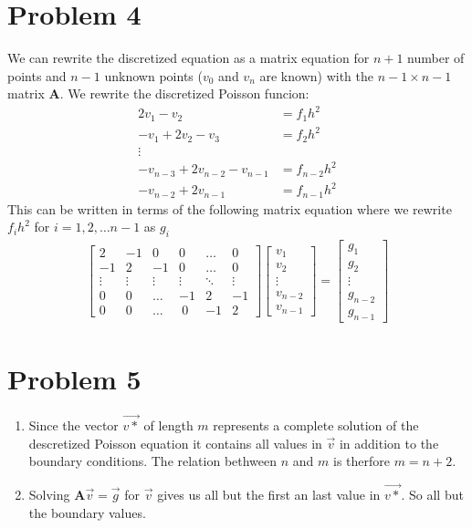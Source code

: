 \documentclass[english,notitlepage]{revtex4-1}  %
\begin{document}
\section*{Problem 4}
We can rewrite the discretized equation as a matrix equation for $n+1$ number of points and $n-1$ unknown points ($v_0$ and $v_n$ are known) with the $n-1\times n-1$ matrix $\boldsymbol{A}$. We rewrite the discretized Poisson funcion:
\begin{align*}
  2 v_1- v_2 &= f_1 h^2\\
  -v_{1} +2 v_2 - v_{3} &= f_2 h^2 \\
    \vdots \\
  -v_{n-3} + 2 v_{n-2} - v_{n-1} &= f_{n-2} h^2\\
  - v_{n-2} + 2 v_{n-1}  &= f_{n-1} h^2
\end{align*}
This can be written in terms of the following matrix equation where we rewrite $f_i h^2$ for $i = 1,2,\dots n-1$ as $g_i$
\begin{align*}
  \begin{bmatrix}
    2 & -1 & 0 & 0 & \dots &0 \\
    -1 & 2 & -1 & 0 &\dots& 0 \\
    \vdots & \vdots & \vdots & \vdots & \ddots & \vdots\\
    0 & 0 & \dots & -1 & 2 & -1 \\
    0 & 0 & \dots & \ 0 &-1 & 2
  \end{bmatrix}
  \begin{bmatrix}
    v_1 \\
    v_2 \\
    \vdots\\
    v_{n-2}\\
    v_{n-1}
  \end{bmatrix}
  =
  \begin{bmatrix}
    g_1 \\
    g_2 \\
    \vdots\\
    g_{n-2}\\
    g_{n-1}
  \end{bmatrix}
\end{align*}
\section*{Problem 5}

\begin{enumerate}[label= \alph*)]
  \item Since the vector $\vec{v*}$ of length $m$ represents a complete solution of the descretized Poisson equation it contains all values in $\vec{v}$ in addition to the boundary conditions. The relation bethween $n$ and $m$ is therfore $m=n+2$.
  \item Solving $\boldsymbol{A}\vec{v} = \vec{g}$ for $\vec{v}$ gives us all but the first an last value in $\vec{v*}$. So all but the boundary values.
\end{enumerate}
\end{document}
